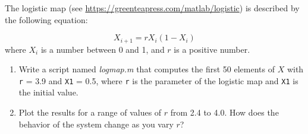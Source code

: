 \begin{ex}
The logistic map (see \url{https://greenteapress.com/matlab/logistic}) is described by the following equation:


\begin{equation*}
X_{i+1} = r X_i (1-X_i)
\end{equation*}
where $X_i$ is a number between 0 and 1, and $r$ is a positive number.

\begin{enumerate}

\item Write a script named \emph{logmap.m} that computes the first 50
elements of $X$ with \lstinline{r} = 3.9 and \lstinline{X1} = 0.5, where
\lstinline{r} is the parameter of the logistic map and \lstinline{X1} is the
initial value.

\item Plot the results for a range of values of $r$ from 2.4 to 4.0.
How does the behavior of the system change as you vary $r$?

\end{enumerate}


\end{ex}

\clearpage

